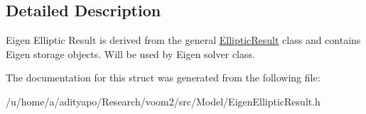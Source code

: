 \subsection{Detailed Description}
Eigen Elliptic Result is derived from the general \hyperlink{structvoom_1_1_elliptic_result}{EllipticResult} class and contains Eigen storage objects. Will be used by Eigen solver class. 

The documentation for this struct was generated from the following file:\begin{DoxyCompactItemize}
\item 
/u/home/a/adityapo/Research/voom2/src/Model/EigenEllipticResult.h\end{DoxyCompactItemize}
